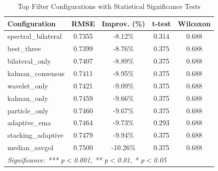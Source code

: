 \begin{table}[htbp]
\centering
\caption{Top Filter Configurations with Statistical Significance Tests}
\label{tab:statistical-significance}
\begin{tabular}{l|c|c|c|c}
\hline
\textbf{Configuration} & \textbf{RMSE} & \textbf{Improv. (\%)} & \textbf{t-test} & \textbf{Wilcoxon} \\
\hline
spectral\_bilateral & 0.7355 & -8.12\% & 0.314 & 0.688 \\
best\_three & 0.7399 & -8.76\% & 0.375 & 0.688 \\
bilateral\_only & 0.7407 & -8.89\% & 0.375 & 0.688 \\
kalman\_consensus & 0.7411 & -8.95\% & 0.375 & 0.688 \\
wavelet\_only & 0.7421 & -9.09\% & 0.375 & 0.688 \\
kalman\_only & 0.7459 & -9.66\% & 0.375 & 0.688 \\
particle\_only & 0.7460 & -9.67\% & 0.375 & 0.688 \\
adaptive\_ema & 0.7464 & -9.73\% & 0.293 & 0.688 \\
stacking\_adaptive & 0.7479 & -9.94\% & 0.375 & 0.688 \\
median\_savgol & 0.7500 & -10.26\% & 0.375 & 0.688 \\
\hline
\multicolumn{5}{l}{\textit{Significance: *** p$<$0.001, ** p$<$0.01, * p$<$0.05}} \\
\hline
\end{tabular}
\end{table}